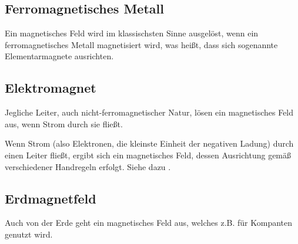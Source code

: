 \subsection{Ferromagnetisches Metall}

Ein magnetisches Feld wird im klassischsten Sinne ausgelöst, wenn ein ferromagnetisches Metall \glqq magnetisiert\grqq{} wird, was heißt, dass sich sogenannte Elementarmagnete ausrichten.


\subsection{Elektromagnet}

Jegliche Leiter, auch nicht-ferromagnetischer Natur, lösen ein magnetisches Feld aus, wenn Strom durch sie fließt.

Wenn Strom (also Elektronen, die kleinste Einheit der negativen Ladung) durch einen Leiter fließt, ergibt sich ein magnetisches Feld, dessen Ausrichtung gemäß verschiedener Handregeln erfolgt. Siehe dazu .


\subsection{Erdmagnetfeld}

Auch von der Erde geht ein magnetisches Feld aus, welches z.B. für Kompanten genutzt wird.

